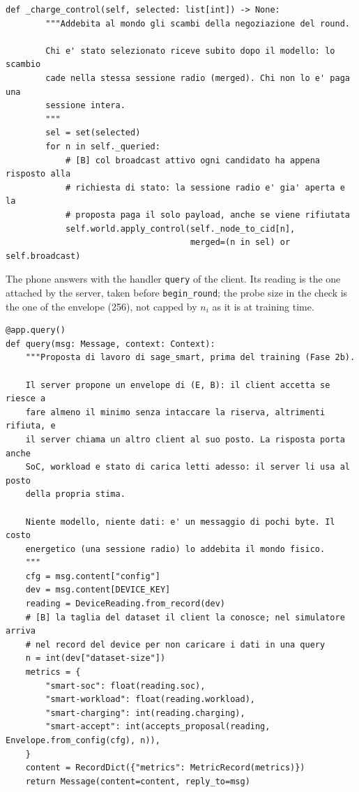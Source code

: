 \documentclass[11pt,a4paper]{article}
\newcommand{\cf}[1]{\texttt{#1}}
\begin{document}
\begin{lstlisting}[style=py,firstnumber=512,caption={\texttt{tesifl/strategies/sage\_smart.py}, lines 512--525}]
    def _charge_control(self, selected: list[int]) -> None:
        """Addebita al mondo gli scambi della negoziazione del round.

        Chi e' stato selezionato riceve subito dopo il modello: lo scambio
        cade nella stessa sessione radio (merged). Chi non lo e' paga una
        sessione intera.
        """
        sel = set(selected)
        for n in self._queried:
            # [B] col broadcast attivo ogni candidato ha appena risposto alla
            # richiesta di stato: la sessione radio e' gia' aperta e la
            # proposta paga il solo payload, anche se viene rifiutata
            self.world.apply_control(self._node_to_cid[n],
                                     merged=(n in sel) or self.broadcast)
\end{lstlisting}

The phone answers with the handler \cf{query} of the client. Its reading is the
one attached by the server, taken before \cf{begin\_round}; the probe size in
the check is the one of the envelope (256), not capped by $n_i$ as it is at
training time.

\begin{lstlisting}[style=py,firstnumber=279,caption={\texttt{tesifl/tesiFL/client\_app.py}, lines 279--305}]
@app.query()
def query(msg: Message, context: Context):
    """Proposta di lavoro di sage_smart, prima del training (Fase 2b).

    Il server propone un envelope di (E, B): il client accetta se riesce a
    fare almeno il minimo senza intaccare la riserva, altrimenti rifiuta, e
    il server chiama un altro client al suo posto. La risposta porta anche
    SoC, workload e stato di carica letti adesso: il server li usa al posto
    della propria stima.

    Niente modello, niente dati: e' un messaggio di pochi byte. Il costo
    energetico (una sessione radio) lo addebita il mondo fisico.
    """
    cfg = msg.content["config"]
    dev = msg.content[DEVICE_KEY]
    reading = DeviceReading.from_record(dev)
    # [B] la taglia del dataset il client la conosce; nel simulatore arriva
    # nel record del device per non caricare i dati in una query
    n = int(dev["dataset-size"])
    metrics = {
        "smart-soc": float(reading.soc),
        "smart-workload": float(reading.workload),
        "smart-charging": int(reading.charging),
        "smart-accept": int(accepts_proposal(reading, Envelope.from_config(cfg), n)),
    }
    content = RecordDict({"metrics": MetricRecord(metrics)})
    return Message(content=content, reply_to=msg)
\end{lstlisting}
\end{document}
